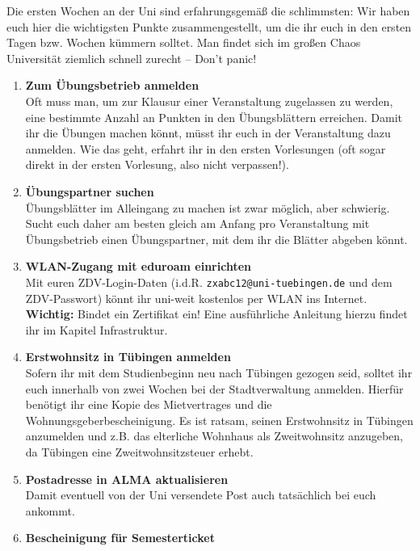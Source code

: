 
Die ersten Wochen an der Uni sind erfahrungsgemäß die schlimmsten: Wir haben euch hier die wichtigsten Punkte zusammengestellt, um die ihr euch in den ersten Tagen bzw. Wochen kümmern solltet. Man findet sich im großen Chaos Universität ziemlich schnell zurecht -- Don't panic!
  
  \begin{enumerate}[label=$\bigcirc$]
  	
  	\item \textbf{Zum Übungsbetrieb anmelden} \\
	  	Oft muss man, um zur Klausur einer Veranstaltung zugelassen zu werden, eine bestimmte Anzahl an Punkten in den Übungsblättern erreichen. Damit ihr die Übungen machen könnt, müsst ihr euch in der Veranstaltung dazu anmelden. Wie das geht, erfahrt ihr in den ersten Vorlesungen (oft sogar direkt in der ersten Vorlesung, also nicht verpassen!).
  	\item \textbf{Übungspartner suchen} \\
	  	Übungsblätter im Alleingang zu machen ist zwar möglich, aber schwierig. Sucht euch daher am besten gleich am Anfang pro Veranstaltung mit Übungsbetrieb einen Übungspartner, mit dem ihr die Blätter abgeben könnt.
  	\item \textbf{WLAN-Zugang mit eduroam einrichten}\\
	  	Mit euren ZDV-Login-Daten (i.d.R. \texttt{zxabc12@uni-tuebingen.de} und dem ZDV-Passwort) könnt ihr uni-weit kostenlos per WLAN ins Internet. \textbf{Wichtig:} Bindet ein Zertifikat ein! Eine ausführliche Anleitung hierzu findet ihr im Kapitel Infrastruktur.
  	\item \textbf{Erstwohnsitz in Tübingen anmelden} \\
	  	Sofern ihr mit dem Studienbeginn neu nach Tübingen gezogen seid, solltet ihr euch innerhalb von zwei Wochen bei der Stadtverwaltung anmelden. Hierfür benötigt ihr eine Kopie des Mietvertrages und die Wohnungsgeberbescheinigung. Es ist ratsam, seinen Erstwohnsitz in Tübingen anzumelden und z.B. das elterliche Wohnhaus als Zweitwohnsitz anzugeben, da Tübingen eine Zweitwohnsitzsteuer erhebt.
	\item \textbf{Postadresse in ALMA aktualisieren}\\
		Damit eventuell von der Uni versendete Post auch tatsächlich bei euch ankommt.
	\item \textbf{Bescheinigung für Semesterticket} \\	

\end{enumerate}
